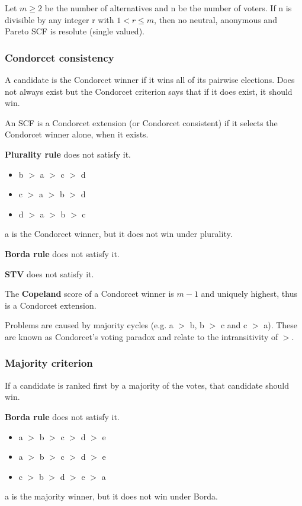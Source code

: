 	\begin{theorem}[Moulin, 1983]
		Let $m \geq 2$ be the number of alternatives and n be the number of voters. If n is divisible by any integer r with $1 < r \leq m$, then no neutral, anonymous and Pareto SCF is resolute (single valued).
	\end{theorem}
	
	\subsubsection{Condorcet consistency}
	A candidate is the Condorcet winner if it wins all of its pairwise elections. Does not always exist but the Condorcet criterion says that if it does exist, it should win.
	
	An SCF is a Condorcet extension (or Condorcet consistent) if it selects the Condorcet winner alone, when it exists.

	\begin{example} \textbf{Plurality rule} does not satisfy it.
		\begin{itemize}
			\item[] b $>$ a $>$ c $>$ d
			\item[] c $>$ a $>$ b $>$ d 
			\item[] d $>$ a $>$ b $>$ c
		\end{itemize}
		a is the Condorcet winner, but it does not win under plurality.
	\end{example}
	
	\textbf{Borda rule} does not satisfy it.
	
	\textbf{STV} does not satisfy it.
	
	The \textbf{Copeland} score of a Condorcet winner is $m-1$ and uniquely highest, thus is a Condorcet extension.
	
	\begin{theorem}
		Problems are caused by majority cycles (e.g. a $>$ b, b $>$ c and c $>$ a). These are known as Condorcet’s voting paradox and relate to the intransitivity of $>$.
	\end{theorem}
	
	\subsubsection{Majority criterion}
	If a candidate is ranked first by a majority of the votes, that candidate should win.
	
	\begin{example} \textbf{Borda rule} does not satisfy it.
		\begin{itemize}
			\item[] a $>$ b $>$ c $>$ d $>$ e
			\item[] a $>$ b $>$ c $>$ d $>$ e
			\item[] c $>$ b $>$ d $>$ e $>$ a
		\end{itemize}
		a is the majority winner, but it does not win under Borda.
	\end{example}

